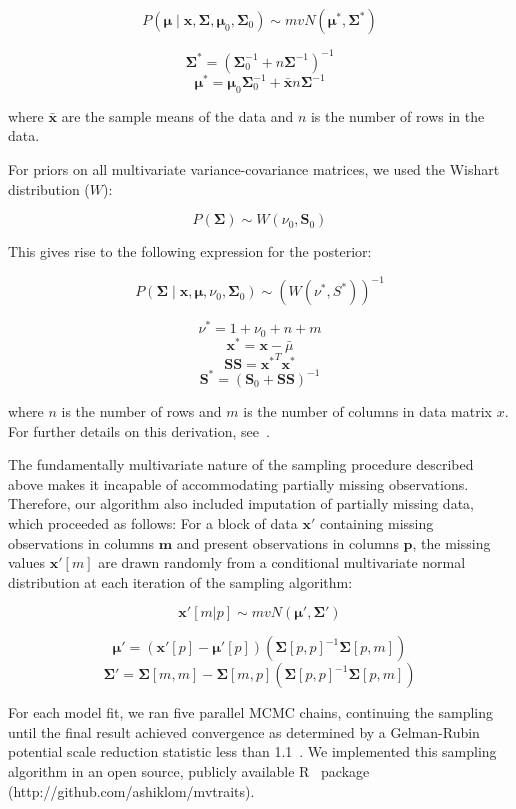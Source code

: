 \[P(\mathbf{\mu} \mid 
    \mathbf{x}, \mathbf{\Sigma}, 
    \mathbf{\mu}_0, \mathbf{\Sigma}_0)
  \sim
  mvN(\mathbf{\mu^*}, \mathbf{\Sigma^*})\]

\[\mathbf{\Sigma^*} = {(\mathbf{\Sigma}_0^{-1} + n \mathbf{\Sigma}^{-1})}^{-1}\]
\[\mathbf{\mu^*} = \mathbf{\mu}_0 \mathbf{\Sigma}_0^{-1} + \bar{\mathbf{x}} n \mathbf{\Sigma}^{-1}\]

where ${\bar{{\mathbf{x}}}}$ are the sample means of the data and $n$ is the number of rows in the data.

For priors on all multivariate variance-covariance matrices, we used the Wishart distribution ($W$):

\[P(\mathbf{\Sigma}) \sim W(\nu_0, \mathbf{S}_0)\]

This gives rise to the following expression for the posterior:

\[P(\mathbf{\Sigma} \mid
  \mathbf{x}, \mathbf{\mu},
  \nu_0, \mathbf{\Sigma}_0)
  \sim
  {(W(\nu^*, S^*))}^{-1}\]

\[\nu^* = 1 + \nu_0 + n + m\]
\[\mathbf{x^*} = \mathbf{x} - \bar{\mu}\]
\[\mathbf{SS} = \mathbf{x^*}^{T} \mathbf{x^*}\]
\[\mathbf{S^*} = {(\mathbf{S}_0 + \mathbf{SS})}^{-1}\]

where $n$ is the number of rows and $m$ is the number of columns in data matrix $x$. For further details on this derivation, see~\cite{gelman_bayesian}. %

The fundamentally multivariate nature of the sampling procedure described above makes it incapable of accommodating partially missing observations.
Therefore, our algorithm also included imputation of partially missing data, which proceeded as follows:
For a block of data $\mathbf{x'}$ containing missing observations in columns $\mathbf{m}$ and present observations in columns $\mathbf{p}$,
the missing values $\mathbf{x'}[m]$ are drawn randomly from a conditional multivariate normal distribution at each iteration of the sampling algorithm:

\[\mathbf{x'}[m|p] \sim mvN(\mathbf{\mu}', \mathbf{\Sigma}')\]

\[\mathbf{\mu'} = 
  (\mathbf{x'}[p] - \mathbf{\mu'}[p]) 
  ({\mathbf{\Sigma}[p,p]}^{-1} \mathbf{\Sigma}[p,m])\]
\[\mathbf{\Sigma'} = \mathbf{\Sigma}[m,m] - 
  \mathbf{\Sigma}[m,p]
  ({\mathbf{\Sigma}[p,p]}^{-1} \mathbf{\Sigma}[p,m])\]

For each model fit, we ran five parallel MCMC chains, continuing the sampling until the final result achieved convergence as determined by a Gelman-Rubin potential scale reduction statistic less than 1.1~\cite{gelman_1992_inference}.
We implemented this sampling algorithm in an open source, publicly available R~\cite[version 3.4.3]{rstats} package (http://github.com/ashiklom/mvtraits).


